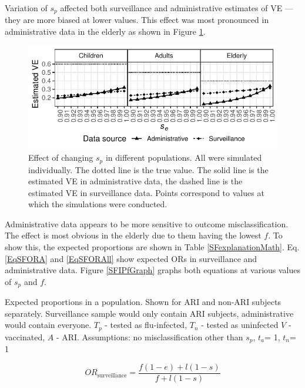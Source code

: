 \documentclass[11pt]{article}
\begin{document}
Variation of $s_p$ affected both surveillance and administrative estimates of VE --- they are more biased at lower values. This effect was most pronounced in administrative data in the elderly as shown in Figure \ref{fig:agesind-spf}.

\begin{figure}[h]
	\centering
		\includegraphics[width=0.75\linewidth]{../fig-agesind/agesind-spec_flu.pdf}
		\caption{
Effect of changing $s_p$ in different populations. All were simulated individually. The dotted line is the true value. The solid line is the estimated VE in administrative data, the dashed line is the estimated VE in surveillance data. Points correspond to values at which the simulations were conducted. \label{fig:agesind-spf}
		}
\end{figure}

Administrative data appears to be more sensitive to outcome misclassification. The effect is most obvious in the elderly due to them having the lowest $f$. To show this, the expected proportions are shown in Table \ref{SFexplanationMath}. Eq. \ref{EqSFORA} and \ref{EqSFORAll} show expected ORs in surveillance and administrative data. Figure \ref{SFIPfGraph} graphs both equations at various values of $s_p$ and $f$.

\pagebreak

\begin{table}[h]
\centering
\caption{
Expected proportions in a population. Shown for ARI and non-ARI subjects separately. Surveillance sample would only contain ARI subjects, administrative would contain everyone. $T_p$ - tested as flu-infected, $T_n$ - tested as uninfected $V$ - vaccinated, $A$ - ARI.
Assumptions: no misclassification other than $s_p$, $t_a$= 1, $t_n$= 1
\label{SFexplanationMath} 
}
	
\end{table}

\begin{equation} \label{EqSFORA}
OR_{\text{surveillance}} = \frac{f(1-e)+l(1-s)}{f+l(1-s)}
\end{equation}
\end{document}
